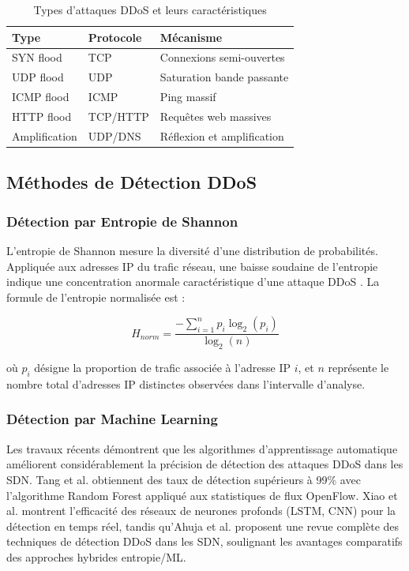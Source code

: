 \documentclass[12pt,a4paper]{report}
\begin{document}
\begin{table}[H]
\centering
\caption{Types d'attaques DDoS et leurs caractéristiques}
\label{tab:ddos_types}
\begin{tabular}{lll}
\toprule
\textbf{Type} & \textbf{Protocole} & \textbf{Mécanisme} \\
\midrule
SYN flood & TCP & Connexions semi-ouvertes \\
UDP flood & UDP & Saturation bande passante \\
ICMP flood & ICMP & Ping massif \\
HTTP flood & TCP/HTTP & Requêtes web massives \\
Amplification & UDP/DNS & Réflexion et amplification \\
\bottomrule
\end{tabular}
\end{table}

\subsection{Méthodes de Détection DDoS}

\subsubsection{Détection par Entropie de Shannon}
L'entropie de Shannon mesure la diversité d'une
distribution de probabilités. Appliquée aux adresses IP
du trafic réseau, une baisse soudaine de l'entropie
indique une concentration anormale caractéristique d'une
attaque DDoS \cite{braga2010lightweight}. La formule de
l'entropie normalisée est :

\begin{equation}
H_{norm} = \frac{-\sum_{i=1}^{n} p_i \log_2(p_i)}{\log_2(n)}
\label{eq:entropie_norm}
\end{equation}

où $p_i$ désigne la proportion de trafic associée à
l'adresse IP $i$, et $n$ représente le nombre total
d'adresses IP distinctes observées dans l'intervalle
d'analyse.

\subsubsection{Détection par Machine Learning}
Les travaux récents démontrent que les algorithmes
d'apprentissage automatique améliorent considérablement
la précision de détection des attaques DDoS dans les SDN.
Tang et al. \cite{tang2020ddos} obtiennent des taux de
détection supérieurs à 99\% avec l'algorithme Random
Forest appliqué aux statistiques de flux OpenFlow. Xiao
et al. \cite{xiao2021deep} montrent l'efficacité des
réseaux de neurones profonds (LSTM, CNN) pour la détection
en temps réel, tandis qu'Ahuja et al.
\cite{ahuja2021comprehensive} proposent une revue
complète des techniques de détection DDoS dans les SDN,
soulignant les avantages comparatifs des approches
hybrides entropie/ML.
\end{document}
